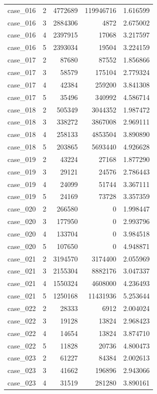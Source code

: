 \begin{longtable}{lrrrr}
case\_016 & 2 & 4772689 & 119946716 & 1.616599 \\
case\_016 & 3 & 2884306 & 4872 & 2.675002 \\
case\_016 & 4 & 2397915 & 17068 & 3.217597 \\
case\_016 & 5 & 2393034 & 19504 & 3.224159 \\
case\_017 & 2 & 87680 & 87552 & 1.856866 \\
case\_017 & 3 & 58579 & 175104 & 2.779324 \\
case\_017 & 4 & 42384 & 259200 & 3.841308 \\
case\_017 & 5 & 35496 & 340992 & 4.586714 \\
case\_018 & 2 & 505349 & 3044352 & 1.987472 \\
case\_018 & 3 & 338272 & 3867008 & 2.969111 \\
case\_018 & 4 & 258133 & 4853504 & 3.890890 \\
case\_018 & 5 & 203865 & 5693440 & 4.926628 \\
case\_019 & 2 & 43224 & 27168 & 1.877290 \\
case\_019 & 3 & 29121 & 24576 & 2.786443 \\
case\_019 & 4 & 24099 & 51744 & 3.367111 \\
case\_019 & 5 & 24169 & 73728 & 3.357359 \\
case\_020 & 2 & 266580 & 0 & 1.998447 \\
case\_020 & 3 & 177950 & 0 & 2.993796 \\
case\_020 & 4 & 133704 & 0 & 3.984518 \\
case\_020 & 5 & 107650 & 0 & 4.948871 \\
case\_021 & 2 & 3194570 & 3174400 & 2.055969 \\
case\_021 & 3 & 2155304 & 8882176 & 3.047337 \\
case\_021 & 4 & 1550324 & 4608000 & 4.236493 \\
case\_021 & 5 & 1250168 & 11431936 & 5.253644 \\
case\_022 & 2 & 28333 & 6912 & 2.004024 \\
case\_022 & 3 & 19128 & 13824 & 2.968423 \\
case\_022 & 4 & 14654 & 13824 & 3.874710 \\
case\_022 & 5 & 11828 & 20736 & 4.800473 \\
case\_023 & 2 & 61227 & 84384 & 2.002613 \\
case\_023 & 3 & 41662 & 196896 & 2.943066 \\
case\_023 & 4 & 31519 & 281280 & 3.890161 \\

\end{longtable}
